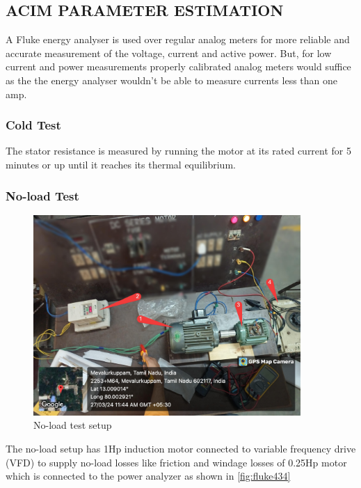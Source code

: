 \subsection{ACIM PARAMETER ESTIMATION}

A Fluke energy analyser is used over regular analog meters for more reliable and accurate measurement of the voltage, current and active power. But, for low current and power measurements properly calibrated analog meters would suffice as the the energy analyser wouldn’t be able to measure currents less than one amp.

\subsubsection{Cold Test}

The stator resistance is measured by running the motor at its rated current for 5 minutes or up until it reaches its thermal equilibrium.


\subsubsection{No-load Test}


\begin{figure}
	\centering
	\includegraphics[width=4in]{sections/section5/images/ParamEstim/SetupNoload.jpg}
	\caption{No-load test setup}
	\label{fig:no_load_test_setup}
\end{figure}

The no-load setup has 1Hp induction motor connected to variable frequency drive (VFD) to supply no-load losses like friction and windage losses of 0.25Hp motor which is connected to the power analyzer as shown in \ref*{fig:fluke434}


